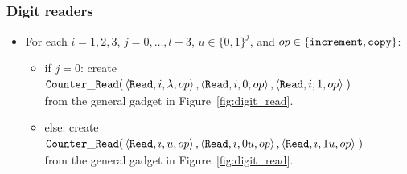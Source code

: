 \subsubsection{ Digit readers }

\begin{itemize}

\item For each $i = 1,2,3$,
               $j = 0,\ldots,l-3$,
               $u \in \{0, 1\}^j$, and
               $op \in \{{\tt increment}, {\tt copy} \}$:
    \begin{itemize}
        \item if $j = 0$:
        create
        $\begin{aligned}[t]
            {\tt Counter\_Read}(& \left\langle {\tt Read}, i, \lambda, op \right\rangle,
                       \left\langle {\tt Read}, i, 0, op \right\rangle,
                       \left\langle {\tt Read}, i, 1, op \right\rangle \;)
        \end{aligned}$\\ from the general gadget in Figure~\ref{fig:digit_read}.

        \item else:
        create
        $\begin{aligned}[t]
        {\tt Counter\_Read}(& \left\langle {\tt Read}, i, u,  op \right\rangle,
                   \left\langle {\tt Read}, i, 0u, op \right\rangle,
                   \left\langle {\tt Read}, i, 1u, op \right\rangle \;)
        \end{aligned}$\\ from the general gadget in Figure~\ref{fig:digit_read}.
    \end{itemize}

\end{itemize}


